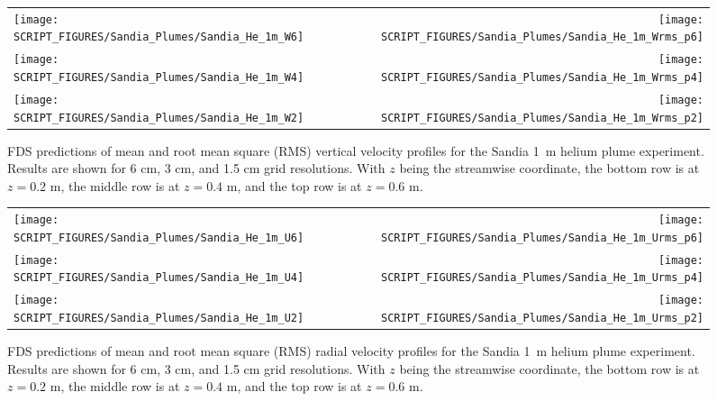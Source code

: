 \newpage

\begin{figure}[p]
\begin{tabular*}{\textwidth}{l@{\extracolsep{\fill}}r}
\texttt{[image: SCRIPT\_FIGURES/Sandia\_Plumes/Sandia\_He\_1m\_W6]} &
\texttt{[image: SCRIPT\_FIGURES/Sandia\_Plumes/Sandia\_He\_1m\_Wrms\_p6]} \\
\texttt{[image: SCRIPT\_FIGURES/Sandia\_Plumes/Sandia\_He\_1m\_W4]} &
\texttt{[image: SCRIPT\_FIGURES/Sandia\_Plumes/Sandia\_He\_1m\_Wrms\_p4]} \\
\texttt{[image: SCRIPT\_FIGURES/Sandia\_Plumes/Sandia\_He\_1m\_W2]} &
\texttt{[image: SCRIPT\_FIGURES/Sandia\_Plumes/Sandia\_He\_1m\_Wrms\_p2]}
\end{tabular*}
\caption[Sandia 1~m helium plume vertical velocity profiles]
{FDS predictions of mean and root mean square (RMS) vertical velocity profiles for the Sandia 1~m helium plume experiment. Results are shown for 6 cm, 3 cm, and 1.5 cm grid resolutions. With $z$ being the streamwise coordinate, the bottom row is at $z=0.2$ m, the middle row is at $z=0.4$ m, and the top row is at $z=0.6$ m.}
\label{Sandia_He_1m_velocity}
\end{figure}

\begin{figure}[p]
\begin{tabular*}{\textwidth}{l@{\extracolsep{\fill}}r}
\texttt{[image: SCRIPT\_FIGURES/Sandia\_Plumes/Sandia\_He\_1m\_U6]} &
\texttt{[image: SCRIPT\_FIGURES/Sandia\_Plumes/Sandia\_He\_1m\_Urms\_p6]} \\
\texttt{[image: SCRIPT\_FIGURES/Sandia\_Plumes/Sandia\_He\_1m\_U4]} &
\texttt{[image: SCRIPT\_FIGURES/Sandia\_Plumes/Sandia\_He\_1m\_Urms\_p4]} \\
\texttt{[image: SCRIPT\_FIGURES/Sandia\_Plumes/Sandia\_He\_1m\_U2]} &
\texttt{[image: SCRIPT\_FIGURES/Sandia\_Plumes/Sandia\_He\_1m\_Urms\_p2]}
\end{tabular*}
\caption[Sandia 1~m helium plume radial velocity profiles.]
{FDS predictions of mean and root mean square (RMS) radial velocity profiles for the Sandia 1~m helium plume experiment. Results are shown for 6 cm, 3 cm, and 1.5 cm grid resolutions. With $z$ being the streamwise coordinate, the bottom row is at $z=0.2$ m, the middle row is at $z=0.4$ m, and the top row is at $z=0.6$ m.}
\label{Sandia_He_1m_velocity_rms}
\end{figure}

